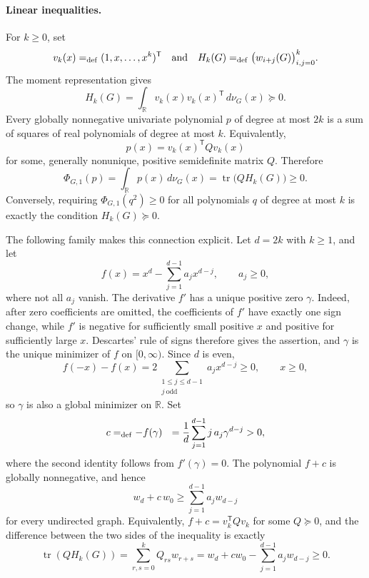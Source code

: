 \documentclass[11pt]{article}
\newcommand{\Real}{\mathbb{R}}
\theoremstyle{remark}
\begin{document}
\paragraph{Linear inequalities.} For $k\geq 0$, set
\[
  v_k(x)=_{\rm def} (1,x,\ldots,x^k)^{\mathsf T}
  \quad\text{and}\quad
  H_k(G)=_{\rm def}\bigl(w_{i+j}(G)\bigr)_{i,j=0}^k.
\]
The moment representation gives
\begin{equation*}\label{eq:hankel-gram}
  H_k(G)
  =\int_{\Real}v_k(x)v_k(x)^{\mathsf T}\,d\nu_G(x)
  \succeq 0.
\end{equation*}
Every globally nonnegative univariate polynomial $p$ of degree at most
$2k$ is a sum of squares of real polynomials of degree at most $k$.
Equivalently,
\[
  p(x)=v_k(x)^{\mathsf T}Qv_k(x)
\]
for some, generally nonunique, positive semidefinite matrix $Q$.  Therefore
\begin{equation*}\label{eq:linear-hankel-pairing}
  \Phi_{G,1}(p)
  =\int_{\Real}p(x)\,d\nu_G(x)
  =\operatorname{tr}\bigl(QH_k(G)\bigr)
  \geq 0.
\end{equation*}
Conversely, requiring $\Phi_{G,1}(q^2) \ge 0$ for all polynomials $q$ of degree at most $k$ is exactly the condition $H_k(G)\succeq 0$.

The following family makes this connection explicit.
Let $d=2k$ with $k\geq 1$, and let
\begin{equation}\label{eq:univariate-polynomial}
  f(x)=x^d-\sum_{j=1}^{d-1}a_jx^{d-j},
  \qquad \textrm{$a_j\geq 0$},
\end{equation}
where not all $a_j$ vanish.  The derivative $f'$ has a unique positive zero $\gamma$.  Indeed, after zero coefficients are omitted, the coefficients of $f'$ have exactly one sign change, while $f'$ is negative for sufficiently small positive $x$ and positive for sufficiently large $x$.  Descartes' rule of signs therefore gives the assertion, and $\gamma$ is the unique minimizer of $f$ on $[0,\infty)$.
Since $d$ is even,
\[
  f(-x)-f(x)
  =2\sum_{\substack{1\leq j\leq d-1\\ j\ \mathrm{odd}}}
       a_jx^{d-j}
  \geq 0, 
  \qquad x\geq 0,
\]
so $\gamma$ is also a global minimizer on $\Real$.  Set
\begin{equation*}\label{eq:univariate-constant}
  c=_{\rm def}-f(\gamma)
    ~~=\frac{1}{d}\sum_{j=1}^{d-1}j\,a_j\gamma^{d-j}>0,
\end{equation*}
where the second identity follows from $f'(\gamma)=0$.  The polynomial $f+c$ is globally nonnegative, and hence
\begin{equation*}\label{eq:univariate-family}
  w_d+c\,w_0
  \geq \sum_{j=1}^{d-1}a_jw_{d-j}
\end{equation*}
for every undirected graph.  Equivalently, $f+c=v_k^{\mathsf T}Qv_k$ for some $Q\succeq0$, and the difference between the two sides of the inequality is exactly 
\[
\operatorname{tr}(QH_k(G))
=\sum_{r,s=0}^kQ_{rs}w_{r+s}
=w_d+cw_0-\sum_{j=1}^{d-1}a_jw_{d-j} \ge 0.
\]
\end{document}
